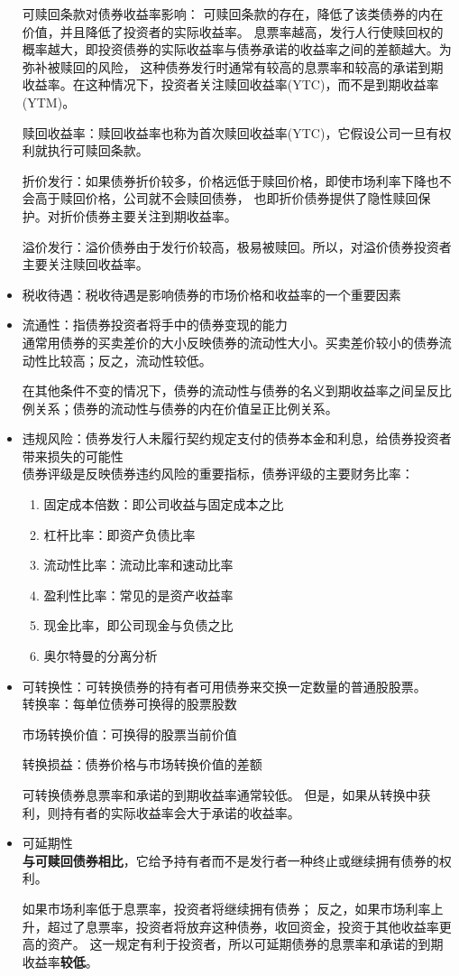 \documentclass{article}
\begin{document}
\begin{itemize}
    可赎回条款对债券收益率影响：
    可赎回条款的存在，降低了该类债券的内在价值，并且降低了投资者的实际收益率。
    息票率越高，发行人行使赎回权的概率越大，即投资债券的实际收益率与债券承诺的收益率之间的差额越大。为弥补被赎回的风险，
    这种债券发行时通常有较高的息票率和较高的承诺到期收益率。在这种情况下，投资者关注赎回收益率(YTC)，而不是到期收益率(YTM)。

    赎回收益率：赎回收益率也称为首次赎回收益率(YTC)，它假设公司一旦有权利就执行可赎回条款。

    折价发行：如果债券折价较多，价格远低于赎回价格，即使市场利率下降也不会高于赎回价格，公司就不会赎回债券，
    也即折价债券提供了隐性赎回保护。对折价债券主要关注到期收益率。

    溢价发行：溢价债券由于发行价较高，极易被赎回。所以，对溢价债券投资者主要关注赎回收益率。
    \item 税收待遇：税收待遇是影响债券的市场价格和收益率的一个重要因素
    \item 流通性：指债券投资者将手中的债券变现的能力\\
    通常用债券的买卖差价的大小反映债券的流动性大小。买卖差价较小的债券流动性比较高；反之，流动性较低。

    在其他条件不变的情况下，债券的流动性与债券的名义到期收益率之间呈反比例关系；债券的流动性与债券的内在价值呈正比例关系。
    \item 违规风险：债券发行人未履行契约规定支付的债券本金和利息，给债券投资者带来损失的可能性\\
    债券评级是反映债券违约风险的重要指标，债券评级的主要财务比率：
    \begin{enumerate}
        \item 固定成本倍数：即公司收益与固定成本之比
        \item 杠杆比率：即资产负债比率 
        \item 流动性比率：流动比率和速动比率
        \item 盈利性比率：常见的是资产收益率
        \item 现金比率，即公司现金与负债之比
        \item 奥尔特曼的分离分析
    \end{enumerate}
    \item 可转换性：可转换债券的持有者可用债券来交换一定数量的普通股股票。\\
    转换率：每单位债券可换得的股票股数 
    
    市场转换价值：可换得的股票当前价值

    转换损益：债券价格与市场转换价值的差额

    可转换债券息票率和承诺的到期收益率通常较低。
    但是，如果从转换中获利，则持有者的实际收益率会大于承诺的收益率。

    \item 可延期性\\
    \textbf{与可赎回债券相比}，它给予持有者而不是发行者一种终止或继续拥有债券的权利。

    如果市场利率低于息票率，投资者将继续拥有债券；
    反之，如果市场利率上升，超过了息票率，投资者将放弃这种债券，收回资金，投资于其他收益率更高的资产。
    这一规定有利于投资者，所以可延期债券的息票率和承诺的到期收益率\textbf{较低}。
\end{itemize}
\end{document}
